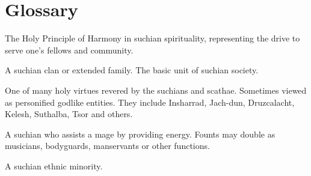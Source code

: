 \documentclass
  [a4paper,
   12pt,
   oneside
  ]%
  {article}
\begin{document}
\section{Glossary}
\begin{gloss}



\begin{comment}
\paragraph{Asheen}
\end{comment}
The Holy Principle of Harmony in suchian spirituality, representing the drive to serve one's fellows and community.



\begin{comment}
\paragraph{brood}
\end{comment}
A suchian clan or extended family. 
The basic unit of suchian society.



\begin{comment}
\paragraph{Epitome}
\end{comment}
One of many holy virtues revered by the suchians and scathae. 
Sometimes viewed as personified godlike entities.
They include Insharrad, Jach-dun, Druzcalacht, Kelesh, Suthalba, Tsor and others.



\begin{comment}
\paragraph{fount}
\end{comment}
A suchian who assists a mage by providing energy.
Founts may double as musicians, bodyguards, manservants or other functions.



\begin{comment}
\paragraph{Felgian}
\end{comment}
A suchian ethnic minority. 




\end{gloss}
\end{document}
